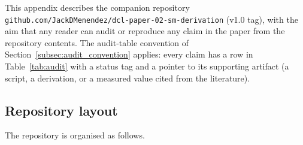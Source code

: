 \label{sec:code_and_data}

This appendix describes the companion repository
\nolinkurl{github.com/JackDMenendez/dcl-paper-02-sm-derivation}
(v1.0 tag), with the aim that any reader can audit or reproduce
any claim in the paper from the repository contents.  The
audit-table convention of Section~\ref{subsec:audit_convention}
applies: every claim has a row in Table~\ref{tab:audit} with a
status tag and a pointer to its supporting artifact (a script, a
derivation, or a measured value cited from the literature).

\subsection{Repository layout}
\label{subsec:repo_layout}

The repository is organised as follows.

